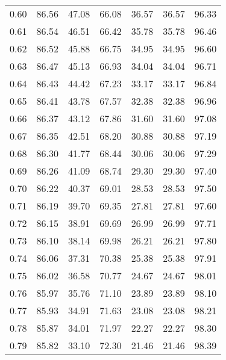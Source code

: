 \begin{tabular}{|c|c|c|c|c|c|c|}
      0.60 &     86.56 &     47.08 &      66.08 &   36.57 &      36.57 &         96.33 \\
      0.61 &     86.54 &     46.51 &      66.42 &   35.78 &      35.78 &         96.46 \\
      0.62 &     86.52 &     45.88 &      66.75 &   34.95 &      34.95 &         96.60 \\
      0.63 &     86.47 &     45.13 &      66.93 &   34.04 &      34.04 &         96.71 \\
      0.64 &     86.43 &     44.42 &      67.23 &   33.17 &      33.17 &         96.84 \\
      0.65 &     86.41 &     43.78 &      67.57 &   32.38 &      32.38 &         96.96 \\
      0.66 &     86.37 &     43.12 &      67.86 &   31.60 &      31.60 &         97.08 \\
      0.67 &     86.35 &     42.51 &      68.20 &   30.88 &      30.88 &         97.19 \\
      0.68 &     86.30 &     41.77 &      68.44 &   30.06 &      30.06 &         97.29 \\
      0.69 &     86.26 &     41.09 &      68.74 &   29.30 &      29.30 &         97.40 \\
      0.70 &     86.22 &     40.37 &      69.01 &   28.53 &      28.53 &         97.50 \\
      0.71 &     86.19 &     39.70 &      69.35 &   27.81 &      27.81 &         97.60 \\
      0.72 &     86.15 &     38.91 &      69.69 &   26.99 &      26.99 &         97.71 \\
      0.73 &     86.10 &     38.14 &      69.98 &   26.21 &      26.21 &         97.80 \\
      0.74 &     86.06 &     37.31 &      70.38 &   25.38 &      25.38 &         97.91 \\
      0.75 &     86.02 &     36.58 &      70.77 &   24.67 &      24.67 &         98.01 \\
      0.76 &     85.97 &     35.76 &      71.10 &   23.89 &      23.89 &         98.10 \\
      0.77 &     85.93 &     34.91 &      71.63 &   23.08 &      23.08 &         98.21 \\
      0.78 &     85.87 &     34.01 &      71.97 &   22.27 &      22.27 &         98.30 \\
      0.79 &     85.82 &     33.10 &      72.30 &   21.46 &      21.46 &         98.39 \\

\end{tabular}
